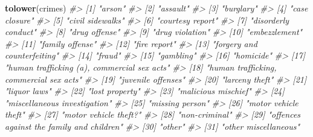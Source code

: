 \documentclass[
  12pt,
]{book}
\newenvironment{Shaded}{\begin{snugshade}}{\end{snugshade}}
\newcommand{\CommentTok}[1]{\textcolor[rgb]{0.37,0.37,0.37}{\textit{#1}}}
\newcommand{\KeywordTok}[1]{\textcolor[rgb]{0.27,0.27,0.27}{\textbf{#1}}}
\newcommand{\NormalTok}[1]{#1}
\begin{document}
\begin{Shaded}
\begin{Highlighting}[]
\KeywordTok{tolower}\NormalTok{(crimes)}
\CommentTok{\#\textgreater{}  [1] "arson"                                     }
\CommentTok{\#\textgreater{}  [2] "assault"                                   }
\CommentTok{\#\textgreater{}  [3] "burglary"                                  }
\CommentTok{\#\textgreater{}  [4] "case closure"                              }
\CommentTok{\#\textgreater{}  [5] "civil sidewalks"                           }
\CommentTok{\#\textgreater{}  [6] "courtesy report"                           }
\CommentTok{\#\textgreater{}  [7] "disorderly conduct"                        }
\CommentTok{\#\textgreater{}  [8] "drug offense"                              }
\CommentTok{\#\textgreater{}  [9] "drug violation"                            }
\CommentTok{\#\textgreater{} [10] "embezzlement"                              }
\CommentTok{\#\textgreater{} [11] "family offense"                            }
\CommentTok{\#\textgreater{} [12] "fire report"                               }
\CommentTok{\#\textgreater{} [13] "forgery and counterfeiting"                }
\CommentTok{\#\textgreater{} [14] "fraud"                                     }
\CommentTok{\#\textgreater{} [15] "gambling"                                  }
\CommentTok{\#\textgreater{} [16] "homicide"                                  }
\CommentTok{\#\textgreater{} [17] "human trafficking (a), commercial sex acts"}
\CommentTok{\#\textgreater{} [18] "human trafficking, commercial sex acts"    }
\CommentTok{\#\textgreater{} [19] "juvenile offenses"                         }
\CommentTok{\#\textgreater{} [20] "larceny theft"                             }
\CommentTok{\#\textgreater{} [21] "liquor laws"                               }
\CommentTok{\#\textgreater{} [22] "lost property"                             }
\CommentTok{\#\textgreater{} [23] "malicious mischief"                        }
\CommentTok{\#\textgreater{} [24] "miscellaneous investigation"               }
\CommentTok{\#\textgreater{} [25] "missing person"                            }
\CommentTok{\#\textgreater{} [26] "motor vehicle theft"                       }
\CommentTok{\#\textgreater{} [27] "motor vehicle theft?"                      }
\CommentTok{\#\textgreater{} [28] "non{-}criminal"                              }
\CommentTok{\#\textgreater{} [29] "offences against the family and children"  }
\CommentTok{\#\textgreater{} [30] "other"                                     }
\CommentTok{\#\textgreater{} [31] "other miscellaneous"                       }

\end{Highlighting}
\end{Shaded}
\end{document}

